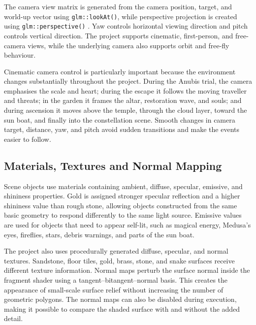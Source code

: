 \documentclass[11pt,a4paper]{article}
\begin{document}
The camera view matrix is generated from the camera position, target, and
world-up vector using \texttt{glm::lookAt()}, while perspective projection is
created using \texttt{glm::perspective()} \cite{glm}. Yaw controls horizontal
viewing direction and pitch controls vertical direction. The project supports
cinematic, first-person, and free-camera views, while the underlying camera
also supports orbit and free-fly behaviour.

Cinematic camera control is particularly important because the environment
changes substantially throughout the project. During the Anubis trial, the
camera emphasises the scale and heart; during the escape it follows the moving
traveller and threats; in the garden it frames the altar, restoration wave, and
souls; and during ascension it moves above the temple, through the cloud layer,
toward the sun boat, and finally into the constellation scene. Smooth changes
in camera target, distance, yaw, and pitch avoid sudden transitions and make
the events easier to follow.


\subsection{Materials, Textures and Normal Mapping}

Scene objects use materials containing ambient, diffuse, specular, emissive,
and shininess properties. Gold is assigned stronger specular reflection and a
higher shininess value than rough stone, allowing objects constructed from the
same basic geometry to respond differently to the same light source. Emissive
values are used for objects that need to appear self-lit, such as magical
energy, Medusa's eyes, fireflies, stars, debris warnings, and parts of the sun
boat.

The project also uses procedurally generated diffuse, specular, and normal
textures. Sandstone, floor tiles, gold, brass, stone, and snake surfaces receive
different texture information. Normal maps perturb the surface normal inside
the fragment shader using a tangent--bitangent--normal basis. This creates the
appearance of small-scale surface relief without increasing the number of
geometric polygons. The normal maps can also be disabled during execution,
making it possible to compare the shaded surface with and without the added
detail.
\end{document}
